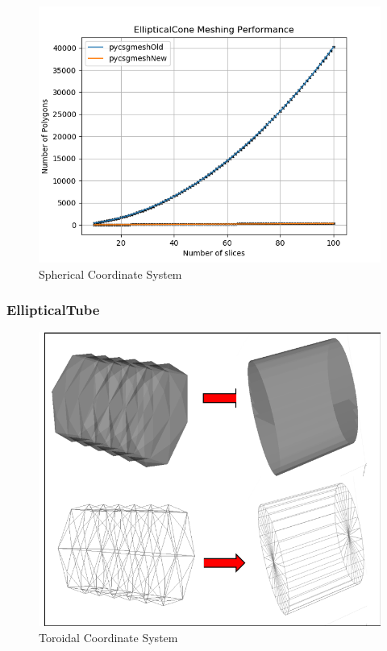 \documentclass[12pt,a4paper]{article}
\begin{document}
\begin{figure}[h!]
\centering
\includegraphics[scale=0.5]{Images//Quad_fits//Ellipticalcone_quad.png}
\caption[width=\columnwidth]{Spherical Coordinate System}
\label{conts}
\end{figure}


\newpage
\subsubsection{EllipticalTube}

\begin{figure}[h!]
\centering
\includegraphics[scale=0.5]{Images//Meshes//ellipticaltube.png}
\caption[width=\columnwidth]{Toroidal Coordinate System}
\label{conts}
\end{figure}
\end{document}
